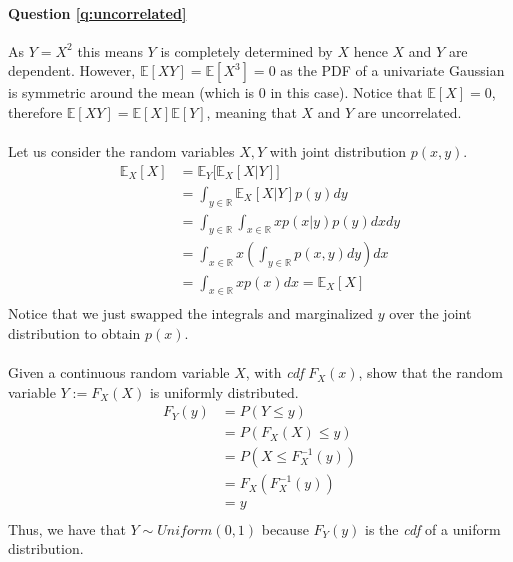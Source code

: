 \paragraph{Question \ref{q:uncorrelated}}
As $Y = X^2$ this means $Y$ is completely determined by $X$ hence $X$ and $Y$ are dependent. However, $\mathbb{E}[XY] = \mathbb{E}[X^3] = 0$ as the PDF of a univariate Gaussian is symmetric around the mean (which is 0 in this case). Notice that $\mathbb{E}[X] = 0$, therefore $\mathbb{E}[XY] = \mathbb{E}[X] \mathbb{E}[Y]$, meaning that $X$ and $Y$ are uncorrelated.

\paragraph{}
Let us consider the random variables $X,Y$ with joint distribution $p(x,y)$.
\begin{align*}
\mathbb{E}_X[X] &= \mathbb{E}_Y\Big[\mathbb{E}_X[X|Y]\Big]\\
&= \int_{y\in\mathbb{R}} \mathbb{E}_X[X|Y] p(y)dy\\
&= \int_{y\in\mathbb{R}} \int_{x\in\mathbb{R}} x p(x|y)p(y) dxdy\\
&=  \int_{x\in\mathbb{R}} x \left(\int_{y\in\mathbb{R}} p(x,y) dy\right)dx\\
&=  \int_{x\in\mathbb{R}} x p(x) dx = \mathbb{E}_X[X]\\
\end{align*}
Notice that we just swapped the integrals and marginalized $y$ over the joint distribution to obtain $p(x)$.


\paragraph{}
Given a continuous random variable $X$, with \textit{cdf} $F_X(x)$, show that the random variable $Y := F_X(X)$ is uniformly distributed.
\begin{align*}
    F_Y(y) &= P(Y \leq y)\\
    &= P(F_X(X) \leq y)\\
    &= P(X \leq F_X^{-1}(y))\\
    &= F_X(F_X^{-1}(y))\\
    &= y\\
\end{align*}
Thus, we have that $Y\sim Uniform(0,1)$ because $F_Y(y)$ is the \textit{cdf} of a uniform distribution.



